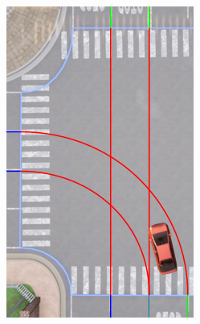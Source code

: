 \begin{figure}
\begin{minipage}[t]{.3\linewidth}
    {\includegraphics[width=\linewidth]{figures/chapter4/lanes-enter.png}}%
  \end{minipage}%
  \hfill
  \begin{minipage}[t]{.3\linewidth}

\end{minipage}
\end{figure}
